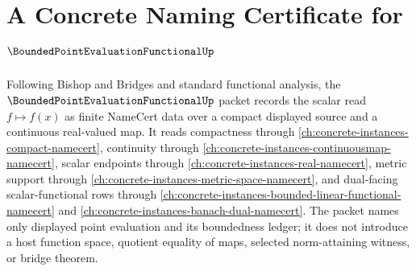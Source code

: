\chapter{A Concrete Naming Certificate for $\BoundedPointEvaluationFunctionalUp$}
\label{ch:concrete-instances-bounded-point-evaluation-functional-namecert}

Following Bishop and Bridges and standard functional analysis, the $\BoundedPointEvaluationFunctionalUp$ packet records the scalar read $f \mapsto f(x)$ as finite NameCert data over a compact displayed source and a continuous real-valued map. It reads compactness through \autoref{ch:concrete-instances-compact-namecert}, continuity through \autoref{ch:concrete-instances-continuousmap-namecert}, scalar endpoints through \autoref{ch:concrete-instances-real-namecert}, metric support through \autoref{ch:concrete-instances-metric-space-namecert}, and dual-facing scalar-functional rows through \autoref{ch:concrete-instances-bounded-linear-functional-namecert} and \autoref{ch:concrete-instances-banach-dual-namecert}. The packet names only displayed point evaluation and its boundedness ledger; it does not introduce a host function space, quotient equality of maps, selected norm-attaining witness, or bridge theorem.

